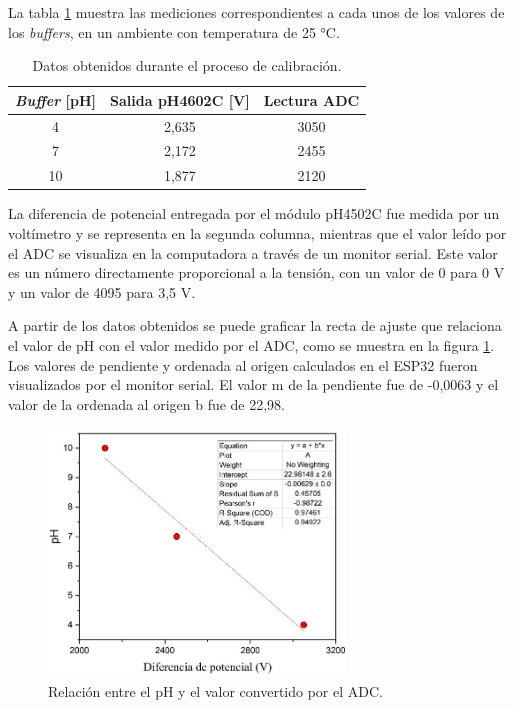 La tabla \ref{tab:ensayoCalibracion} muestra las mediciones correspondientes a cada unos de los valores de los \textit{buffers}, en un ambiente con temperatura de 25 °C. 

\begin{table}[h]
	\centering
	\caption[Resultados calibración.]{Datos obtenidos durante el proceso de calibración.}
	\begin{tabular}{c c c }    
		\toprule
		\textbf{\textit{Buffer} [pH]} & \textbf{Salida pH4602C [V] }	&    \textbf{Lectura ADC}  \\
		\midrule
		4 	& 2,635 & 3050 \\		
		7	& 2,172 & 2455 \\
		10	& 1,877 & 2120 \\
		\bottomrule
		\hline
	\end{tabular}
	\label{tab:ensayoCalibracion}
\end{table}

La diferencia de potencial entregada por el módulo pH4502C fue medida por un voltímetro y se representa en la segunda columna, mientras que el valor leído por el ADC se visualiza en la computadora a través de un monitor serial. Este valor es un número directamente proporcional a la tensión, con un valor de 0 para 0 V y un valor de 4095 para 3,5 V.

A partir de los datos obtenidos se puede graficar la recta de ajuste que relaciona el valor de pH con el valor medido por el ADC, como se muestra en la figura \ref{fig:rectaADC}. Los valores de pendiente y ordenada al origen calculados en el ESP32 fueron visualizados por el monitor serial. El valor m de la pendiente fue de -0,0063 y el valor de la ordenada al origen b fue de 22,98. 

\begin{figure}[htbp]
	\centering
	\includegraphics[width=0.7\textwidth]{./Figures/rectaADC.jpg}
	\caption{Relación entre el pH y el valor convertido por el ADC.}
	\label{fig:rectaADC}
\end{figure}

